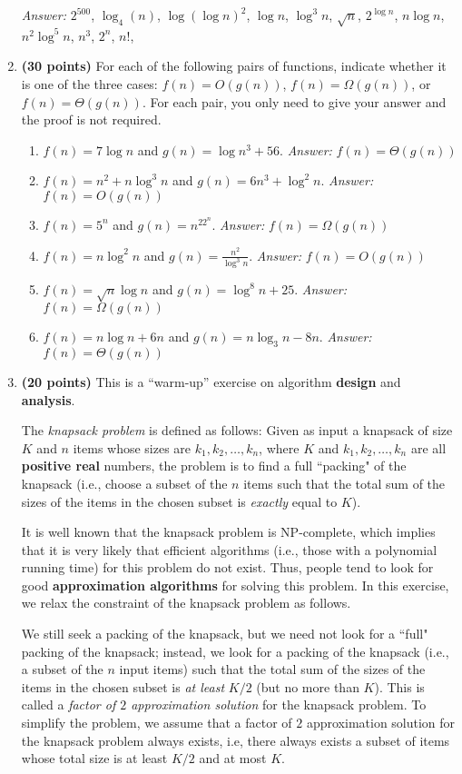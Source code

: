 \documentclass[11pt]{article}
\begin{document}
\begin{enumerate}
\textit{Answer:}  $2^{500}$, $\log_4(n)$, $\log(\log n)^2$, $\log n$, $\log^3n$, $\sqrt{n}$, $2^{\log n}$, $n\log n$, $n^2\log^5 n$, $n^3$, $2^n$, $n!$, 

\item
{\bf (30 points)}
For each of the following pairs of functions, indicate
whether it is one of the three cases: $f(n)=O(g(n))$, $f(n)=\Omega(g(n))$, or $f(n)=\Theta(g(n))$. For each pair, you only need to give your answer and the proof is not required.


\begin{enumerate}
\item $f(n)=7\log n$ and $g(n)=\log n^3 + 56$. \textit{Answer:} $f(n)=\Theta(g(n))$
\item $f(n)=n^2+n\log^3 n$ and $g(n)=6n^3+\log^2n$. \textit{Answer:} $f(n)=O(g(n))$
\item $f(n)=5^n$ and $g(n)=n^22^n$. \textit{Answer:} $f(n)=\Omega(g(n))$
\item $f(n)=n\log^2n$ and $g(n)=\frac{n^2}{\log^3 n}$. \textit{Answer:} $f(n)=O(g(n))$
\item $f(n)=\sqrt{n}\log n$ and $g(n)=\log^8n+25$. \textit{Answer:} $f(n)=\Omega(g(n))$
\item $f(n)= n\log n+6n$ and $g(n) = n\log_3 n-8n$. \textit{Answer:} $f(n)=\Theta(g(n))$
\end{enumerate}



\item
{\bf (20 points)}
This is a ``warm-up'' exercise on algorithm {\bf design} and {\bf analysis}.

The {\em knapsack problem} is defined as follows: Given as input a
knapsack of size $K$ and $n$ items whose sizes are
$k_1,k_2,\ldots,k_n$, where $K$ and $k_1,k_2,\ldots,k_n$ are all {\bf positive real}
numbers, the problem is to find a full ``packing" of the knapsack (i.e., choose a subset
of the $n$ items such that the total sum of the sizes of the items in
the chosen subset is {\em exactly} equal to $K$).

It is well known that the knapsack problem is NP-complete, which
implies that it is very likely that efficient algorithms (i.e., those
with a polynomial running time) for this problem do not exist. Thus,
people tend to look for good {\bf approximation algorithms} for
solving this problem. In this exercise, we relax the constraint of the
knapsack problem as follows.

We still seek a packing of the knapsack,
but we need not look for a ``full" packing of the knapsack; instead,
we look for a packing of the knapsack (i.e., a subset of the $n$ input
items) such that the total sum of the sizes of the items in the chosen
subset is {\em at least} $K/2$ (but no more than $K$).
This is called a {\em factor of $2$
approximation solution} for the knapsack problem. To simplify the
problem, we assume that a factor of $2$ approximation solution for the
knapsack problem always exists, i.e, there always exists a subset of items whose total size is at least $K/2$ and at most $K$.


\end{enumerate}
\end{document}
